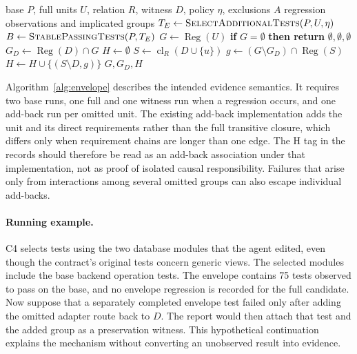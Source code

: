 \documentclass[a4paper,fleqn]{cas-sc}
\newcommand{\lab}[1]{\textsf{#1}}
\newcommand{\cl}{\operatorname{cl}}
\begin{document}
\begin{algorithm}[tbp]
\caption{Envelope observations and add-back witnesses (C4)}\label{alg:envelope}
\begin{algorithmic}[1]
\Require base $P$, full units $U$, relation $R$, witness $D$, policy $\eta$, exclusions $A$
\Ensure regression observations and implicated groups
\State $T_E\gets\Call{SelectAdditionalTests}{P,U,\eta}$
\State $B\gets\Call{StablePassingTests}{P,T_E}$
\State $G\gets\operatorname{Reg}(U)$ 
\State \textbf{if} $G=\emptyset$ \textbf{then return} $\emptyset,\emptyset,\emptyset$
\State $G_D\gets\operatorname{Reg}(D)\cap G$
\State $H\gets\emptyset$
  \State $S\gets\cl_R(D\cup\{u\})$
  \State $g\gets(G\setminus G_D)\cap\operatorname{Reg}(S)$
   \State $H\gets H\cup\{(S\setminus D,g)\}$ \EndIf
\EndFor
\State \Return $G,G_D,H$
\end{algorithmic}
\end{algorithm}

Algorithm~\ref{alg:envelope} describes the intended evidence semantics. It requires two base runs, one full and one witness run when a regression occurs, and one add-back run per omitted unit. The existing add-back implementation adds the unit and its direct requirements rather than the full transitive closure, which differs only when requirement chains are longer than one edge. The \lab{H} tag in the records should therefore be read as an add-back association under that implementation, not as proof of isolated causal responsibility. Failures that arise only from interactions among several omitted groups can also escape individual add-backs.

\paragraph{Running example.}
C4 selects tests using the two database modules that the agent edited, even though the contract's original tests concern generic views. The selected modules include the base backend operation tests. The envelope contains 75 tests observed to pass on the base, and no envelope regression is recorded for the full candidate. Now suppose that a separately completed envelope test failed only after adding the omitted adapter route back to $D$. The report would then attach that test and the added group as a preservation witness. This hypothetical continuation explains the mechanism without converting an unobserved result into evidence.
\end{document}
